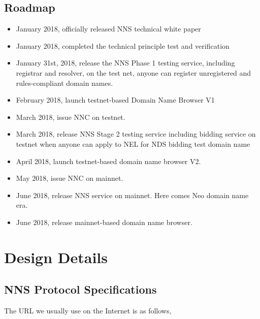 \documentclass[letterpaper,10pt,english]{sphinxmanual}
\begin{document}
\section{Roadmap}
\label{\detokenize{nns_system:roadmap}}
\begin{itemize}
\item {} 
January 2018, officially released NNS technical white paper

\item {} 
January 2018, completed the technical principle test and verification

\item {} 
January 31st, 2018, release the NNS Phase 1 testing service, including registrar and resolver, on the test net, anyone can register unregistered and rules-compliant domain names.

\item {} 
February 2018,  launch testnet-based Domain Name Browser V1

\end{itemize}

\begin{itemize}
\item {} 
March 2018, issue NNC on testnet.

\item {} 
March 2018, release NNS Stage 2 testing service including bidding service on testnet when anyone can apply to NEL for NDS bidding test domain name

\item {} 
April 2018, launch testnet-based domain name browser V2.

\item {} 
May 2018, issue NNC on mainnet.

\item {} 
June 2018, release NNS service on mainnet. Here comes Neo domain name era.

\item {} 
June 2018, release mainnet-based domain name browser.

\end{itemize}


\chapter{Design Details}
\label{\detokenize{nns_protocol:design-details}}\label{\detokenize{nns_protocol::doc}}

\section{NNS Protocol Specifications}
\label{\detokenize{nns_protocol:nns-protocol-specifications}}
The URL we usually use on the Internet is as follows,
\end{document}

